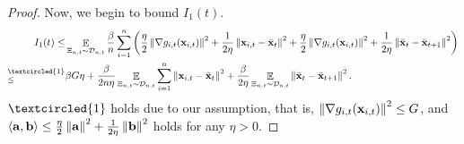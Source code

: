 \documentclass{article}
\begin{document}
\begin{proof}
Now, we begin to bound $I_1(t)$.
\begin{align}
\nonumber
I_1(t) \le & \EE_{ \Xi_{n,t} \sim \Dcal_{n,t} }\frac{\beta}{n}\sum_{i=1}^n \lrincir{ \frac{\eta}{2}\lrnorm{\nabla g_{i,t}(\x_{i,t})}^2 + \frac{1}{2\eta}\lrnorm{\x_{i,t} - \bar{\x}_t}^2  + \frac{\eta}{2}\lrnorm{\nabla g_{i,t}(\x_{i,t})}^2 + \frac{1}{2\eta}\lrnorm{\bar{\x}_t - \bar{\x}_{t+1}}^2 }\\ \nonumber
\refabovecir{\le}{\textcircled{1}} & \beta G \eta + \frac{\beta}{2n\eta } \EE_{ \Xi_{n,t} \sim \Dcal_{n,t} } \sum_{i=1}^n \lrnorm{\x_{i,t} - \bar{\x}_t}^2 + \frac{\beta }{2\eta }\EE_{ \Xi_{n,t} \sim \Dcal_{n,t} } \lrnorm{\bar{\x}_t - \bar{\x}_{t+1}}^2.
\end{align} $\textcircled{1}$ holds due to our assumption, that is, $\left\lVert\nabla g_{i,t}({\bf x}_{i,t})\right\rVert^2 \le G$, and $\left\langle{\bf a},{\bf b} \right\rangle \le \frac{\eta}{2}\left\lVert{\bf a}\right\rVert^2 + \frac{1}{2\eta}\left\lVert{\bf b}\right\rVert^2$ holds for any $\eta>0$.


\end{proof}
\end{document}
